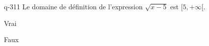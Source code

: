 \begin{truefalse}{q-311}
Le domaine de définition de l'expression $\sqrt{x-5}$ est $[5,+\infty[$.
\item* Vrai
\item Faux
\end{truefalse}

